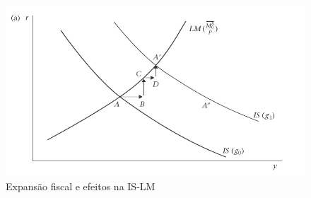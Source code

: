 \documentclass[a4paper,12pt]{article}[abntex2]
\begin{document}
\begin{itemize}
\begin{figure}[H]
    \end{figure}
    \begin{figure}[H]
        \centering
        \caption{Expansão fiscal e efeitos na IS-LM}
        \includegraphics[width=0.7\linewidth]{Imagens/a4i7.png}
    \end{figure}
\end{itemize}
\end{document}
